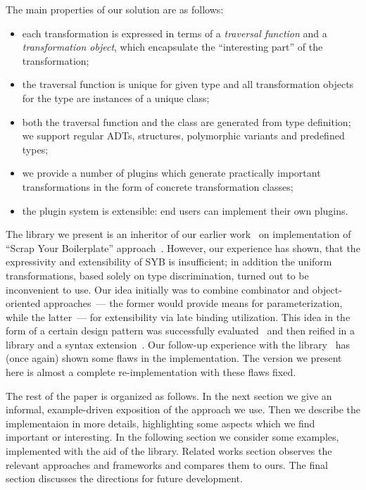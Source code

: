 The main properties of our solution are as follows:

\begin{itemize}
\item each transformation is expressed in terms of a \emph{traversal function} and a \emph{transformation object}, which encapsulate the ``interesting part''
  of the transformation;
\item the traversal function is unique for given type and all transformation objects for the type are instances of a unique class;
\item both the traversal function and the class are generated from type definition; we support regular ADTs, structures, polymorphic variants and predefined types;
\item we provide a number of plugins which generate practically important transformations in the form of concrete transformation classes;
\item the plugin system is extensible: end users can implement their own plugins.
\end{itemize}

The library we present is an inheritor of our earlier work~\cite{SYBOCaml} on implementation of ``Scrap Your Boilerplate'' approach~\cite{SYB,SYB1,SYB2}. However,
our experience has shown, that the expressivity and extensibility of SYB is insufficient; in addition the uniform transformations, based solely on type discrimination, turned out to be
inconvenient to use. Our idea initially was to combine combinator and object-oriented approaches~--- the former would provide means for parameterization, while the
latter~--- for extensibility via late binding utilization. This idea in the form of a certain design pattern was successfully evaluated~\cite{SCICO} and then reified
in a library and a syntax extension~\cite{TransformationObjects}. Our follow-up experience with the library~\cite{OCanren} has (once again) shown some flaws in the
implementation. The version we present here is almost a complete re-implementation with these flaws fixed.

The rest of the paper is organized as follows. In the next section we give an informal, example-driven exposition of
the approach we use. Then we describe the implementaion in more details, highlighting some aspects which we find important or
interesting. In the following section we consider some examples, implemented with the aid of the library. Related works
section observes the relevant approaches and frameworks and compares them to ours. The final section discusses the directions for
future development.


